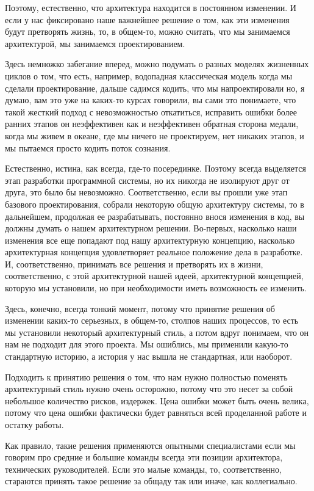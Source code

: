 Поэтому, естественно, что архитектура находится в постоянном изменении. И если у нас фиксировано наше важнейшее решение о том, как эти изменения будут претворять жизнь, то, в общем-то, можно считать, что мы занимаемся архитектурой, мы занимаемся проектированием.

Здесь немножко забегание вперед, можно подумать о разных моделях жизненных циклов о том, что есть, например, водопадная классическая модель когда мы сделали проектирование, дальше садимся кодить, что мы напроектировали но, я думаю, вам это уже на каких-то курсах говорили, вы сами это понимаете, что такой жесткий подход с невозможностью откатиться, исправить ошибки более ранних этапов он неэффективен как и неэффективен обратная сторона медали, когда мы живем в океане, где мы ничего не проектируем, нет никаких этапов, и мы пытаемся просто кодить поток сознания.

 Естественно, истина, как всегда, где-то посерединке. Поэтому всегда выделяется этап разработки программной системы, но их никогда не изолируют друг от друга, это было бы невозможно. Соответственно, если вы прошли уже этап базового проектирования, собрали некоторую общую архитектуру системы, то в дальнейшем, продолжая ее разрабатывать, постоянно внося изменения в код, вы должны думать о нашем архитектурном решении. Во-первых, насколько наши изменения все еще попадают под нашу архитектурную концепцию, насколько архитектурная концепция удовлетворяет реальное положение дела в разработке. И, соответственно, принимать все решения и претворять их в жизни, соответственно, с этой архитектурной нашей идеей, архитектурной концепцией, которую мы установили, но при необходимости иметь возможность ее изменить.

Здесь, конечно, всегда тонкий момент, потому что принятие решения об изменении каких-то серьезных, в общем-то, столпов наших процессов, то есть мы установили некоторый архитектурный стиль, а потом вдруг понимаем, что он нам не подходит для этого проекта. Мы ошиблись, мы применили какую-то стандартную историю, а история у нас вышла не стандартная, или наоборот.

Подходить к принятию решения о том, что нам нужно полностью поменять архитектурный стиль нужно очень осторожно, потому что это несет за собой небольшое количество рисков, издержек. Цена ошибки может быть очень велика, потому что цена ошибки фактически будет равняться всей проделанной работе и остатку работы.

Как правило, такие решения применяются опытными специалистами если мы говорим про средние и большие команды всегда эти позиции архитектора, технических руководителей. Если это малые команды, то, соответственно, стараются принять такое решение за общаду так или иначе, как коллегиально.

